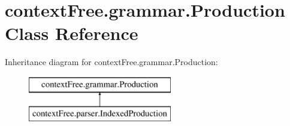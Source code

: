 \hypertarget{classcontext_free_1_1grammar_1_1_production}{\section{context\-Free.\-grammar.\-Production Class Reference}
\label{classcontext_free_1_1grammar_1_1_production}
}
Inheritance diagram for context\-Free.\-grammar.\-Production\-:\begin{figure}[H]
\begin{center}
\leavevmode
\includegraphics[height=2.000000cm]{classcontext_free_1_1grammar_1_1_production}
\end{center}
\end{figure}
